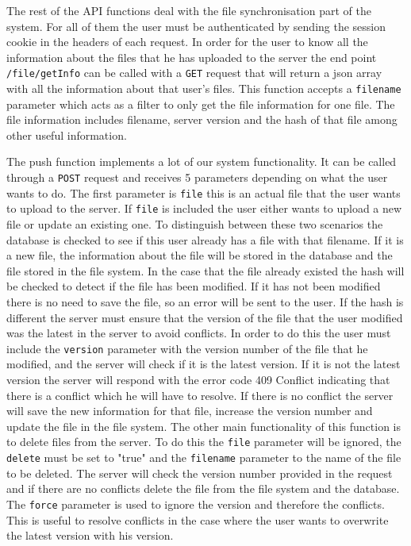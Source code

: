 \documentclass[11pt]{article}
\begin{document}
The rest of the API functions deal with the file synchronisation part of the system. For all of them the user must be authenticated by sending the session cookie in the headers of each request. In order for the user to know all the information about the files that he has uploaded to the server the end point {\tt /file/getInfo} can be called with a {\tt GET} request that will return a json array with all the information about that user's files. This function accepts a {\tt filename} parameter which acts as a filter to only get the file information for one file. The file information includes filename, server version and the hash of that file among other useful information.

The push function implements a lot of our system functionality. It can be called through a {\tt POST} request and receives 5 parameters depending on what the user wants to do. The first parameter is {\tt file} this is an actual file that the user wants to upload to the server. If {\tt file} is included the user either wants to upload a new file or update an existing one. To distinguish between these two scenarios the database is checked to see if this user already has a file with that filename. If it is a new file, the information about the file will be stored in the database and the file stored in the file system. In the case that the file already existed the hash will be checked to detect if the file has been modified. If it has not been modified there is no need to save the file, so an error will be sent to the user. If the hash is different the server must ensure that the version of the file that the user modified was the latest in the server to avoid conflicts. In order to do this the user must include the {\tt version} parameter with the version number of the file that he modified, and the server will check if it is the latest version. If it is not the latest version the server will respond with the error code 409 Conflict indicating that there is a conflict which he will have to resolve. If there is no conflict the server will save the new information for that file, increase the version number and update the file in the file system. The other main functionality of this function is to delete files from the server. To do this the {\tt file} parameter will be ignored, the {\tt delete} must be set to "true" and the {\tt filename} parameter to the name of the file to be deleted. The server will check the version number provided in the request and if there are no conflicts delete the file from the file system and the database. The {\tt force} parameter is used to ignore the version and therefore the conflicts. This is useful to resolve conflicts in the case where the user wants to overwrite the latest version with his version.
\end{document}
